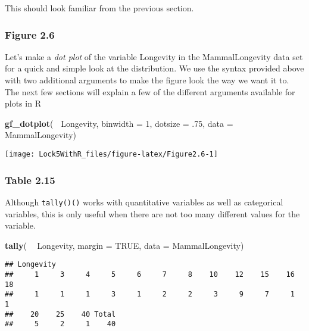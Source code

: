 \documentclass[]{book}
\newenvironment{Shaded}{\begin{snugshade}}{\end{snugshade}}
\newcommand{\DataTypeTok}[1]{\textcolor[rgb]{0.13,0.29,0.53}{#1}}
\newcommand{\DecValTok}[1]{\textcolor[rgb]{0.00,0.00,0.81}{#1}}
\newcommand{\FloatTok}[1]{\textcolor[rgb]{0.00,0.00,0.81}{#1}}
\newcommand{\KeywordTok}[1]{\textcolor[rgb]{0.13,0.29,0.53}{\textbf{#1}}}
\newcommand{\NormalTok}[1]{#1}
\newcommand{\OperatorTok}[1]{\textcolor[rgb]{0.81,0.36,0.00}{\textbf{#1}}}
\newcommand{\OtherTok}[1]{\textcolor[rgb]{0.56,0.35,0.01}{#1}}
\newcommand{\StringTok}[1]{\textcolor[rgb]{0.31,0.60,0.02}{#1}}
\begin{document}
This should look familiar from the previous section.

\hypertarget{figure-2.6}{%
\subsubsection{Figure 2.6}\label{figure-2.6}}

Let's make a \emph{dot plot} of the variable Longevity in the {MammalLongevity} data set for a quick and simple look at the distribution. We use the syntax provided above with two additional arguments to make the figure look the way we want it to. The next few sections will explain a few of the different arguments available for plots in R

\begin{Shaded}
\begin{Highlighting}[]
\KeywordTok{gf_dotplot}\NormalTok{(}\OperatorTok{~}\StringTok{ }\NormalTok{Longevity, }\DataTypeTok{binwidth =} \DecValTok{1}\NormalTok{, }\DataTypeTok{dotsize =} \FloatTok{.75}\NormalTok{, }\DataTypeTok{data =}\NormalTok{ MammalLongevity)}
\end{Highlighting}
\end{Shaded}

\texttt{[image: Lock5WithR\_files/figure-latex/Figure2.6-1]}

\hypertarget{table-2.15}{%
\subsubsection{Table 2.15}\label{table-2.15}}

Although \texttt{tally()()} works with quantitative variables as well as categorical variables, this is only useful when there are not too many different values for the variable.

\begin{Shaded}
\begin{Highlighting}[]
\KeywordTok{tally}\NormalTok{( }\OperatorTok{~}\StringTok{ }\NormalTok{Longevity, }\DataTypeTok{margin =} \OtherTok{TRUE}\NormalTok{, }\DataTypeTok{data =}\NormalTok{ MammalLongevity)}
\end{Highlighting}
\end{Shaded}

\begin{verbatim}
## Longevity
##     1     3     4     5     6     7     8    10    12    15    16    18 
##     1     1     1     3     1     2     2     3     9     7     1     1 
##    20    25    40 Total 
##     5     2     1    40
\end{verbatim}
\end{document}
